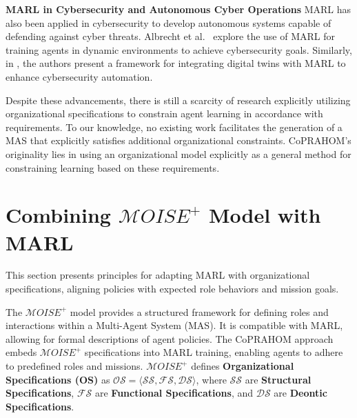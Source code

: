 \documentclass[conference]{IEEEtran}
\begin{document}

\textbf{MARL in Cybersecurity and Autonomous Cyber Operations} \quad
MARL has also been applied in cybersecurity to develop autonomous systems capable of defending against cyber threats. Albrecht et al.~\cite{Albrecht2024} explore the use of MARL for training agents in dynamic environments to achieve cybersecurity goals.
Similarly, in \cite{Hammar2022}, the authors present a framework for integrating digital twins with MARL to enhance cybersecurity automation.

Despite these advancements, there is still a scarcity of research explicitly utilizing organizational specifications to constrain agent learning in accordance with requirements. To our knowledge, no existing work facilitates the generation of a MAS that explicitly satisfies additional organizational constraints. CoPRAHOM's originality lies in using an organizational model explicitly as a general method for constraining learning based on these requirements.

\section{Combining $\mathcal{M}OISE^+$ Model with MARL}
\label{sec:marl_moise_linking}

This section presents principles for adapting MARL with organizational specifications, aligning policies with expected role behaviors and mission goals.

The $\mathcal{M}OISE^+$ model provides a structured framework for defining roles and interactions within a Multi-Agent System (MAS). It is compatible with MARL, allowing for formal descriptions of agent policies. The CoPRAHOM approach embeds $\mathcal{M}OISE^+$ specifications into MARL training, enabling agents to adhere to predefined roles and missions. $\mathcal{M}OISE^+$ defines \textbf{Organizational Specifications (OS)} as $\mathcal{OS} = \langle \mathcal{SS}, \mathcal{FS}, \mathcal{DS} \rangle$, where $\mathcal{SS}$ are \textbf{Structural Specifications}, $\mathcal{FS}$ are \textbf{Functional Specifications}, and $\mathcal{DS}$ are \textbf{Deontic Specifications}.
\end{document}
